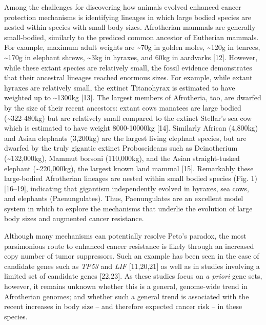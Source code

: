 \documentclass[10pt,letterpaper]{article}
\begin{document}
Among the challenges for discovering how animals evolved enhanced cancer
protection mechanisms is identifying lineages in which large bodied
species are nested within species with small body sizes. Afrotherian
mammals are generally small-bodied, similarly to the prediced common
ancestor of Eutherian mammals. For example, maximum adult weights are
\textasciitilde{}70g in golden moles, \textasciitilde{}120g in tenrecs,
\textasciitilde{}170g in elephant shrews, \textasciitilde{}3kg in
hyraxes, and 60kg in aardvarks {[}12{]}. However, while these extant
species are relatively small, the fossil evidence demonstrates that
their ancestral lineages reached enormous sizes. For example, while
extant hyraxes are relatively small, the extinct Titanohyrax is
estimated to have weighted up to \textasciitilde{}1300kg {[}13{]}. The
largest members of Afrotheria, too, are dwarfed by the size of their
recent ancestors: extant cows manatees are large bodied
(\textasciitilde{}322-480kg) but are relatively small compared to the
extinct Stellar's sea cow which is estimated to have weight 8000-10000kg
{[}14{]}. Similarly African (4,800kg) and Asian elephants (3,200kg) are
the largest living elephant species, but are dwarfed by the truly
gigantic extinct Proboscideans such as Deinotherium
(\textasciitilde{}132,000kg), Mammut borsoni (110,000kg), and the Asian
straight-tusked elephant (\textasciitilde{}220,000kg), the largest known
land mammal {[}15{]}. Remarkably these large-bodied Afrotherian lineages
are nested within small bodied species (Fig. 1) {[}16--19{]}, indicating
that gigantism independently evolved in hyraxes, sea cows, and elephants
(Paenungulates). Thus, Paenungulates are an excellent model system in
which to explore the mechanisms that underlie the evolution of large
body sizes and augmented cancer resistance.

Although many mechanisms can potentially resolve Peto's paradox, the
most parsimonious route to enhanced cancer resistance is likely through
an increased copy number of tumor suppressors. Such an example has been
seen in the case of candidate genes such as \emph{TP53} and \emph{LIF}
{[}11,20,21{]} as well as in studies involving a limited set of
candidate genes {[}22,23{]}. As these studies focus on \emph{a priori}
gene sets, however, it remains unknown whether this is a general,
genome-wide trend in Afrotherian genomes; and whether such a general
trend is associated with the recent increases in body size -- and
therefore expected cancer risk -- in these species.
\end{document}
